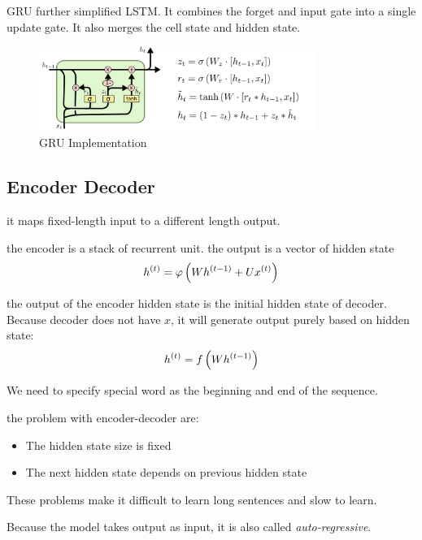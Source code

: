\begin{definition}[GRU]
    GRU further simplified LSTM. It combines the forget and input gate into a single update gate. It also merges the cell state and hidden state.
\begin{figure}[H]
\includegraphics[width=0.8\textwidth]{pic/04/LSTM3-var-GRU.png}
\centering
\caption{GRU Implementation}
\end{figure}
\end{definition}



\subsection{Encoder Decoder}

it maps fixed-length input to a different length output.

the encoder is a stack of recurrent unit. the output is a vector of hidden state
\begin{equation}
    {h}^{(t)} = \varphi \left(W {h}^{(t-1)} + U {x}^{(t)} \right)
\end{equation}

the output of the encoder hidden state is the initial hidden state of decoder. Because decoder does not have $x$, it will generate output purely based on hidden state:
\begin{equation}
    {h}^{(t)} = f \left(W {h}^{(t-1)} \right)
\end{equation}

We need to specify special word as the beginning and end of the sequence.

the problem with encoder-decoder are:
\begin{itemize}
    \item The hidden state size is fixed
    \item The next hidden state depends on previous hidden state
\end{itemize}
These problems make it difficult to learn long sentences and slow to learn.

Because the model takes output as input, it is also called \emph{auto-regressive}.


